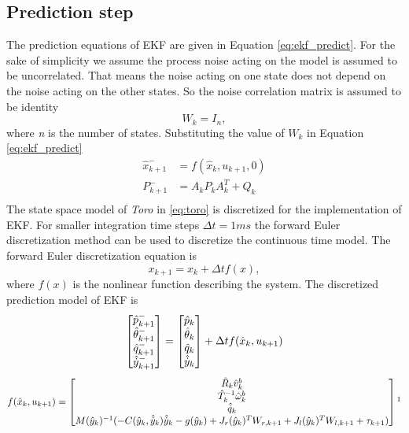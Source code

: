 \subsection{Prediction step}
\label{subsec:toro_predict}
The prediction equations of EKF are given in Equation \ref{eq:ekf_predict}. For the sake of simplicity we assume the process noise acting on the model is assumed to be uncorrelated. That means the noise acting on one state does not depend on the noise acting on the other states. So the noise correlation matrix is assumed to be identity $$W_k = I_{n},$$ where \emph{n} is the number of states. Substituting the value of $W_k$ in Equation \ref{eq:ekf_predict}
\begin{equation}
\label{eq:predict}
\begin{split}
\hat{x}_{k+1}^- &= f(\hat{x}_{k},u_{k+1},0)\\
P_{k+1}^- &= A_kP_{k}A_k^T + Q_{k}\\
\end{split}
\end{equation}
The state space model of \emph{Toro} in \ref{eq:toro} is discretized for the implementation of EKF. For smaller integration time steps $\Delta t = 1ms$ the forward Euler discretization method can be used to discretize the continuous time model. The forward Euler discretization equation is $$ x_{k+1} = x_k + \Delta t f(x),$$ where $f(x)$ is the nonlinear function describing the system. The discretized prediction model of EKF is
\begin{equation}
\label{eq:toro_dis}
	\begin{bmatrix}
	\hat{p}_{k+1}^- \\ \hat{\theta}_{k+1}^- \\ \hat{q}_{k+1}^- \\ \hat{\dot{y}}_{k+1}^-
	\end{bmatrix}
	 =   
	 \begin{bmatrix}
	 \hat{p}_k \\ \hat{\theta}_k \\ \hat{q}_k \\ \hat{\dot{y}}_{k}
	\end{bmatrix}	  
	+ \Delta t f(\hat{x}_k,u_{k+1}) \\
\end{equation}
$$ f(\hat{x}_k,u_{k+1}) = 
	\begin{bmatrix}
	\hat R_k \hat v^b_k \\
	\hat T_k^{-1} \hat \omega_k^b  \\
	\hat{\dot{q}}_k\\
	M(\hat{y}_{k})^{-1}(-C(\hat{y}_{k},\hat{\dot{y}}_{k})\hat{\dot{y}}_{k} -g(\hat{y}_{k}) +  J_r(\hat{y}_{k})^{T}W_{r,k+1} +J_l(\hat{y}_{k})^{T}W_{l,k+1} + \tau_{k+1})	
	\end{bmatrix} \footnotemark[1] $$

